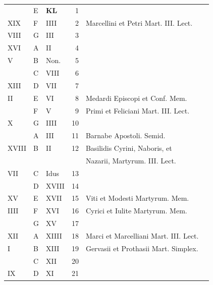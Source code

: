 \begin{center}
\begin{tabular}{l | l | l | r | l l}
\color{Red}  & E & \textbf{\color{Red} K\color{Blue}L} & 1 & & \color{Red} \\
\color{Red} XIX & F & \color{Red} IIII & 2 & Marcellini et Petri Mart. III. Lect. & \color{Red} \\
\color{Red} VIII & G & \color{Red} III & 3 & & \color{Red} \\
\color{Red} XVI & \color{Red} A & \color{Red} II & 4 & & \color{Red} \\
\color{Red} V & B & \color{Red} Non. & 5 & & \color{Red} \\
\color{Red}  & C & \color{Red} VIII & 6 & & \color{Red} \\
\color{Red} XIII & D & \color{Red} VII & 7 & & \color{Red} \\
\color{Red} II & E & \color{Red} VI & 8 & Medardi Episcopi et Conf. Mem. & \color{Red} \\
\color{Red}  & F & \color{Red} V & 9 & Primi et Feliciani Mart. III. Lect. & \color{Red} \\
\color{Red} X & G & \color{Red} IIII & 10 & & \color{Red} \\
\color{Red}  & \color{Red} A & \color{Red} III & 11 & \color{Red} Barnabe Apostoli. Semid. \\
\color{Red} XVIII & B & \color{Red} II & 12 & \multicolumn{2}{l}{\color{Red} Basilidis Cyrini, Naboris, et } \\
 &  &  &  & \quad \color{Red} Nazarii, Martyrum. III. Lect. \\
\color{Red} VII & C & \color{Red} Idus & 13 & & \color{Red} \\
\color{Red}  & D & \color{Red} XVIII & 14 & \\
\color{Red} XV & E & \color{Red} XVII & 15 & \color{Red} Viti et Modesti Martyrum. Mem. \\
\color{Red} IIII & F & \color{Red} XVI & 16 & \color{Red} Cyrici et Iulite Martyrum. Mem. \\
\color{Red}  & G & \color{Red} XV & 17 & \\
\color{Red} XII & \color{Red} A & \color{Red} XIIII & 18 & \color{Red} Marci et Marcelliani Mart. III. Lect. \\
\color{Red} I & B & \color{Red} XIII & 19 & \color{Red} Gervasii et Prothasii Mart. Simplex. \\
\color{Red}  & C & \color{Red} XII & 20 & & \color{Red} \\
\color{Red} IX & D & \color{Red} XI & 21 & & \color{Red} \\

\end{tabular}
\end{center}
